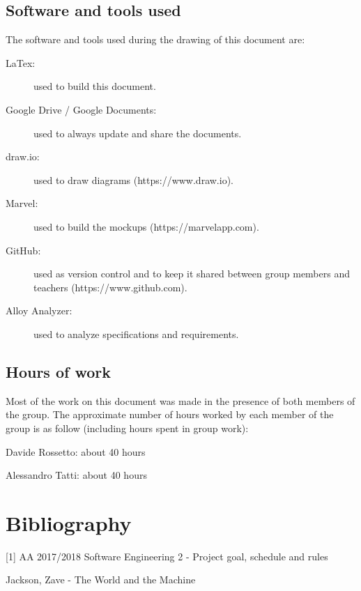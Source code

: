 \documentclass{article}
\begin{document}
	\subsection{Software and tools used}
	The software and tools used during the drawing of this document are:
	\begin{description}
		\item[LaTex:] used to build this document.
		\item[Google Drive / Google Documents:] used to always update and share the documents.
		\item[draw.io:] used to draw diagrams (https://www.draw.io).
		\item[Marvel:] used to build the mockups (https://marvelapp.com).
		\item[GitHub:] used as version control and to keep it shared between group members and teachers (https://www.github.com).
		\item[Alloy Analyzer:] used to analyze specifications and requirements.
	\end{description}


	\subsection{Hours of work}
	Most of the work on this document was made in the presence of both members of the group. The approximate number of hours worked by each member of the group is as follow (including hours spent in group work):

	\bigskip
	Davide Rossetto: about 40 hours
	
	Alessandro Tatti: about 40 hours


	\section{Bibliography}

	[1] AA 2017/2018 Software Engineering 2 - Project goal, schedule and rules
	
	\noindent
	\bigskip
	[2] Jackson, Zave - The World and the Machine
\end{document}
